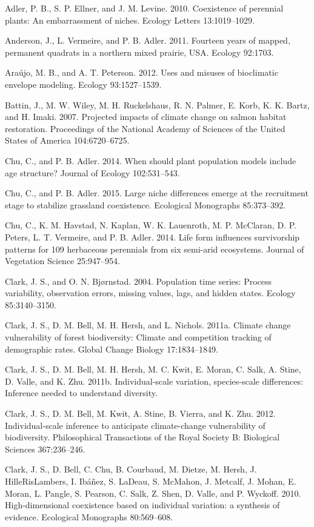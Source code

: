 \documentclass[12pt,]{article}
\begin{document}
Adler, P. B., S. P. Ellner, and J. M. Levine. 2010. Coexistence of
perennial plants: An embarrassment of niches. Ecology Letters
13:1019--1029.

Anderson, J., L. Vermeire, and P. B. Adler. 2011. Fourteen years of
mapped, permanent quadrats in a northern mixed prairie, USA. Ecology
92:1703.

Araújo, M. B., and A. T. Peterson. 2012. Uses and misuses of bioclimatic
envelope modeling. Ecology 93:1527--1539.

Battin, J., M. W. Wiley, M. H. Ruckelshaus, R. N. Palmer, E. Korb, K. K.
Bartz, and H. Imaki. 2007. Projected impacts of climate change on salmon
habitat restoration. Proceedings of the National Academy of Sciences of
the United States of America 104:6720--6725.

Chu, C., and P. B. Adler. 2014. When should plant population models
include age structure? Journal of Ecology 102:531--543.

Chu, C., and P. B. Adler. 2015. Large niche differences emerge at the
recruitment stage to stabilize grassland coexistence. Ecological
Monographs 85:373--392.

Chu, C., K. M. Havstad, N. Kaplan, W. K. Lauenroth, M. P. McClaran, D.
P. Peters, L. T. Vermeire, and P. B. Adler. 2014. Life form influences
survivorship patterns for 109 herbaceous perennials from six semi-arid
ecosystems. Journal of Vegetation Science 25:947--954.

Clark, J. S., and O. N. Bjørnstad. 2004. Population time series: Process
variability, observation errors, missing values, lags, and hidden
states. Ecology 85:3140--3150.

Clark, J. S., D. M. Bell, M. H. Hersh, and L. Nichols. 2011a. Climate
change vulnerability of forest biodiversity: Climate and competition
tracking of demographic rates. Global Change Biology 17:1834--1849.

Clark, J. S., D. M. Bell, M. H. Hersh, M. C. Kwit, E. Moran, C. Salk, A.
Stine, D. Valle, and K. Zhu. 2011b. Individual-scale variation,
species-scale differences: Inference needed to understand diversity.

Clark, J. S., D. M. Bell, M. Kwit, A. Stine, B. Vierra, and K. Zhu.
2012. Individual-scale inference to anticipate climate-change
vulnerability of biodiversity. Philosophical Transactions of the Royal
Society B: Biological Sciences 367:236--246.

Clark, J. S., D. Bell, C. Chu, B. Courbaud, M. Dietze, M. Hersh, J.
HilleRisLambers, I. Ibáñez, S. LaDeau, S. McMahon, J. Metcalf, J. Mohan,
E. Moran, L. Pangle, S. Pearson, C. Salk, Z. Shen, D. Valle, and P.
Wyckoff. 2010. High-dimensional coexistence based on individual
variation: a synthesis of evidence. Ecological Monographs 80:569--608.
\end{document}
